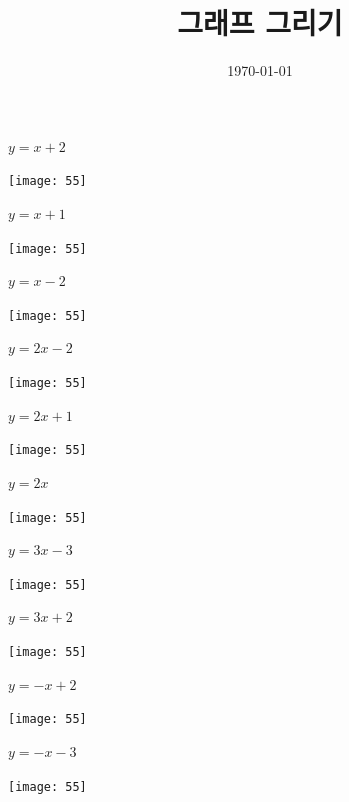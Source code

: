 \documentclass[a4paper]{oblivoir}
\title{그래프 그리기}
\date{\today}
\author{}
\begin{document}
\maketitle

\begin{minipage}{0.45\textwidth}\centering
\(y=x+2\)
\par\bigskip\texttt{[image: 55]}
\end{minipage}
\begin{minipage}{0.45\textwidth}\centering
\(y=x+1\)
\par\bigskip\texttt{[image: 55]}
\end{minipage}\bigskip\bigskip\par
\begin{minipage}{0.45\textwidth}\centering
\(y=x-2\)
\par\bigskip\texttt{[image: 55]}
\end{minipage}
\begin{minipage}{0.45\textwidth}\centering
\(y=2x-2\)
\par\bigskip\texttt{[image: 55]}
\end{minipage}\bigskip\bigskip\par

\clearpage
\begin{minipage}{0.45\textwidth}\centering
\(y=2x+1\)
\par\bigskip\texttt{[image: 55]}
\end{minipage}
\begin{minipage}{0.45\textwidth}\centering
\(y=2x\)
\par\bigskip\texttt{[image: 55]}
\end{minipage}\bigskip\bigskip\par
\begin{minipage}{0.45\textwidth}\centering
\(y=3x-3\)
\par\bigskip\texttt{[image: 55]}
\end{minipage}
\begin{minipage}{0.45\textwidth}\centering
\(y=3x+2\)
\par\bigskip\texttt{[image: 55]}
\end{minipage}\bigskip\bigskip\par
\begin{minipage}{0.45\textwidth}\centering
\(y=-x+2\)
\par\bigskip\texttt{[image: 55]}
\end{minipage}
\begin{minipage}{0.45\textwidth}\centering
\(y=-x-3\)
\par\bigskip\texttt{[image: 55]}
\end{minipage}\bigskip\bigskip\par
\end{document}
